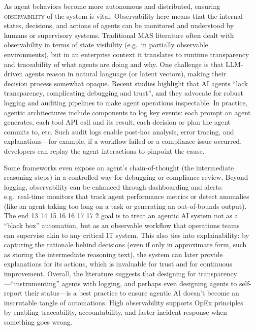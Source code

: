 As agent behaviors become more autonomous and distributed, ensuring \textsc{observability} of the system is vital. Observability here means that the internal states, decisions, and actions of agents can be monitored and understood by humans or supervisory systems. Traditional MAS literature often dealt with observability in terms of state visibility (e.g.~in partially observable environments), but in an enterprise context it translates to runtime transparency and traceability of what agents are doing and why. One challenge is that LLM-driven agents reason in natural language (or latent vectors), making their decision process somewhat opaque. Recent studies highlight that AI agents “lack transparency, complicating debugging and trust”, and they advocate for robust logging and auditing pipelines to make agent operations inspectable. In practice, agentic architectures include components to log key events: each prompt an agent generates, each tool API call and its result, each decision or plan the agent commits to, etc. Such audit logs enable post-hoc analysis, error tracing, and explanations---for example, if a workflow failed or a compliance issue occurred, developers can replay the agent interactions to pinpoint the cause. 

Some frameworks even expose an agent's chain-of-thought (the intermediate reasoning steps) in a controlled way for debugging or compliance review. Beyond logging, observability can be enhanced through dashboarding and alerts: e.g.~real-time monitors that track agent performance metrics or detect anomalies (like an agent taking too long on a task or generating an out-of-bounds output). The end 13 14 15 16 16 17 17 2 goal is to treat an agentic AI system not as a “black box” automation, but as an observable workflow that operations teams can supervise akin to any critical IT system. This also ties into explainability: by capturing the rationale behind decisions (even if only in approximate form, such as storing the intermediate reasoning text), the system can later provide explanations for its actions, which is invaluable for trust and for continuous improvement. Overall, the literature suggests that designing for transparency---“instrumenting” agents with logging, and perhaps even designing agents to self-report
their status---is a best practice to ensure agentic AI doesn't become an inscrutable tangle of
automations. High observability supports OpEx principles by enabling traceability, accountability, and faster incident response when something goes wrong.

